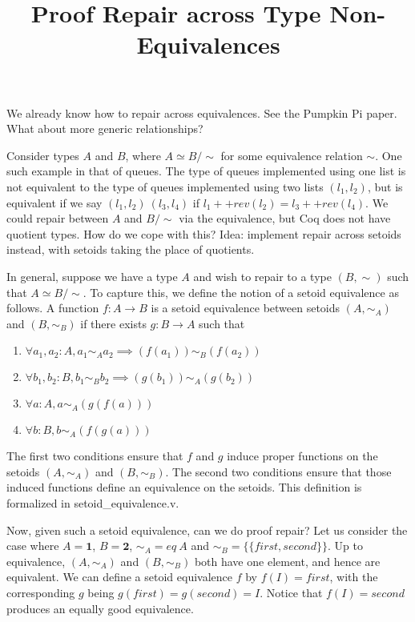 \documentclass{article}
\title{Proof Repair across Type Non-Equivalences}
\begin{document}
\maketitle
We already know how to repair across equivalences. See the Pumpkin Pi paper. What about more generic relationships?

Consider types $A$ and $B$, where $A \simeq B/\sim$ for some equivalence relation $\sim$. One such example in that of queues. The type of queues implemented using one list is not equivalent to the type of queues implemented using two lists $(l_1, l_2)$, but is equivalent if we say $(l_1, l_2) ~ (l_3, l_4)$ if $l_1 ++ rev(l_2) = l_3 ++ rev(l_4)$. We could repair between $A$ and $B/\sim$ via the equivalence, but Coq does not have quotient types. How do we cope with this? Idea: implement repair across setoids instead, with setoids taking the place of quotients.

In general, suppose we have a type $A$ and wish to repair to a type $(B, \sim)$ such that $A \simeq B/\sim$. To capture this, we define the notion of a setoid equivalence as follows. A function $f : A \to B$ is a setoid equivalence between setoids $(A, \sim_A)$ and $(B, \sim_B)$ if there exists $g : B \to A$ such that 
\begin{enumerate}
\item $\forall a_1, a_2 : A, a_1 \sim_A a_2 \implies (f(a_1)) \sim_B (f(a_2))$
\item $\forall b_1, b_2 : B, b_1 \sim_B b_2 \implies (g(b_1)) \sim_A (g(b_2))$
\item $\forall a : A, a \sim_A (g (f(a)))$
\item $\forall b : B, b \sim_A (f (g(a)))$
\end{enumerate}
The first two conditions ensure that $f$ and $g$ induce proper functions on the setoids $(A, \sim_A)$ and $(B, \sim_B)$. The second two conditions ensure that those induced functions define an equivalence on the setoids. This definition is formalized in setoid\_equivalence.v.

Now, given such a setoid equivalence, can we do proof repair? Let us consider the case where $A = \textbf{1}$, $B = \textbf{2}$, $\sim_A = eq\ A$ and $\sim_B = \{\{first, second\}\}$. Up to equivalence, $(A, \sim_A)$ and $(B, \sim_B)$ both have one element, and hence are equivalent. We can define a setoid equivalence $f$ by $f(I) = first$, with the corresponding $g$ being $g(first) = g(second) = I$. Notice that $f(I) = second$ produces an equally good equivalence. 
\end{document}
